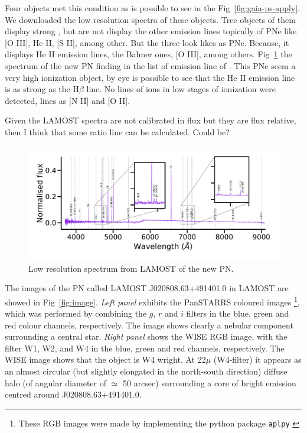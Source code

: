 \documentclass[fleqn,usenatbib]{mnras}
\begin{document}
Four objects met this  condition as is possible to see in the Fig~\ref{fig:gaia-ps-apply}.
We downloaded the low resolution spectra of these objects. 
Tree objects of them display strong \ha{}, but are not display the other emission lines topically
of PNe like [O III], He II, [S II], among other. But the three look likes as PNe.
Because, it displays He II emission lines, the Balmer ones, [O III], among others.
Fig~\ref{fig:spectra} the spectrum of the new PN finding in the list of emission line of
\citet{Skoda:2020}. This PNe seem a very high ionization object, by eye is possible to see
that the He II emission line is as strong as the H$\beta$ line. No lines of ions in low stages
of ionization were detected, lines as [N II] and [O II].


Given the LAMOST spectra are not calibrated in flux but they are flux relative,
then I think that some ratio line can be calculated. Could be?

\begin{figure}
\centering
  \includegraphics[width=\linewidth]{Figs/spec-56581-VB031N50V1_sp08-218.pdf}
  \caption{Low resolution spectrum from LAMOST of the new PN.} 
  \label{fig:spectra}
\end{figure}

The images of the PN called LAMOST J020808.63+491401.0 in LAMOST are showed
in Fig~\ref{fig:image}.
\textit{Left panel} exhibits the PanSTARRS coloured
images \footnote{These RGB images were made by implementing
the python package \texttt{aplpy} \citep{aplpy:2019}}, which
was performed by combining the $g$, $r$ and $i$ filters in
the blue, green and red colour channels, respectively.
The image shows clearly a nebular component surrounding 
a central star. \textit{Right panel} shows the
WISE RGB image, with the filter W1, W2, and W4 in
the blue, green and red channels, respectively.
 The WISE image shows that the object is W4 wright.  
At 22$\mu$ (W4-filter) it appears as an almost
circular (but slightly elongated in the north-south direction)
diffuse halo (of angular diameter of $\simeq$ 50 arcsec) surrounding
a core of bright emission centred around J020808.63+491401.0. 
\end{document}
